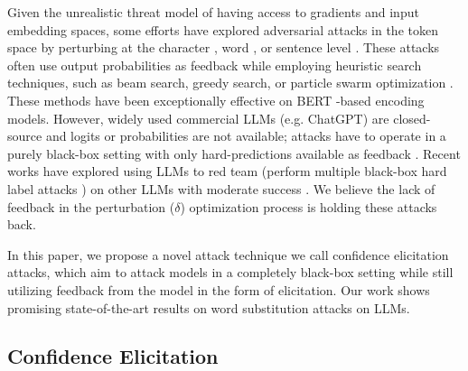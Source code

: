Given the unrealistic threat model of having access to gradients and input embedding spaces, some efforts have explored adversarial attacks in the token space by perturbing at the character \citep{TextBugger, Viper, SSTA,Empirical_Punctuation}, word \citep{Textfooler, PWWS, BERTAttack, morphin}, or sentence level \citep{Sentance_Level_Attack, Paraphrase_Attack, Paraphrase_Attack_2,Multi-Hop-Attacks}. These attacks often use output probabilities as feedback while employing heuristic search techniques, such as beam search, greedy search, or particle swarm optimization \citep{Sememe_PSO}. These methods have been exceptionally effective on BERT \citep{BERT}-based encoding models. However, widely used commercial LLMs (e.g. ChatGPT) are closed-source and logits or probabilities are not available; attacks have to operate  in a purely black-box setting with only hard-predictions available as feedback \citep{sspattack}. Recent works have explored using LLMs to red team (perform multiple black-box hard label attacks \citep{HardLabel}) on other LLMs with moderate success \citep{PAIR, LLM_Fool_Itself}. We believe the lack of feedback in the perturbation ($\delta$) optimization process is holding these attacks back.

In this paper, we propose a novel attack technique we call confidence elicitation attacks, which aim to attack models in a completely black-box setting while still utilizing feedback from the model in the form of elicitation. Our work shows promising state-of-the-art results on word substitution attacks on LLMs.


\subsection{Confidence Elicitation}
\vspace{-0em}

